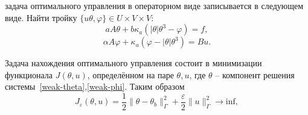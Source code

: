 \documentclass[10pt]{article}
\begin{document}
    задача оптимального управления в операторном виде записывается в следующем виде.
    Найти тройку $\{u \theta, \varphi \} \in U \times V \times V$:
    \begin{equation}
        \label{weak-theta}
        a A \theta + b \kappa_a (| \theta | \theta^3 - \varphi ) = f,
    \end{equation}
    \begin{equation}
        \label{weak-phi}
        \alpha A \varphi + \kappa_a (\varphi - |\theta|\theta^3)  = Bu.
    \end{equation}

    Задача нахождения оптимального управления состоит в минимизации функционала $J(\theta, u)$,
    определённом на паре $\theta, u$, где $\theta$ -- компонент
    решения системы~\eqref{weak-theta},\eqref{weak-phi}.
    Таким образом
    \begin{equation}
        \label{minimization}
        J_\varepsilon(\theta, u) = \frac{1}{2}\|\theta -\theta_b\|^2_\Gamma
        + \frac{\varepsilon}{2}\|u\|^2_\Gamma \rightarrow \text{inf},
    \end{equation}
\end{document}
